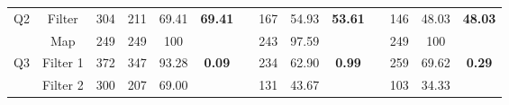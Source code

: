 \begin{table}
\begin{tabular}{cccccccccccccc}
\multirow{2}{*}{Q2}             & Filter                              & 304                             & 211                                                                     & 69.41                                                                      & \multirow{2}{*}{\textbf{69.41}} &           & 167                                                                     & 54.93                                                                      & \multirow{2}{*}{\textbf{53.61}} &           & 146                                                                     & 48.03                                                                      & \multirow{2}{*}{\textbf{48.03}} \\
                                & Map                                 & 249                             & 249                                                                     & 100                                                                        &                                 &           & 243                                                                     & 97.59                                                                      &                                 &           & 249                                                                     & 100                                                                        &                                 \\ \hline
\multirow{4}{*}{Q3}             & Filter 1                            & 372                             & 347                                                                     & 93.28                                                                      & \multirow{4}{*}{\textbf{0.09}}  &           & 234                                                                     & 62.90                                                                      & \multirow{4}{*}{\textbf{0.99}}  &           & 259                                                                     & 69.62                                                                      & \multirow{4}{*}{\textbf{0.29}}  \\
                                & Filter 2                            & 300                             & 207                                                                     & 69.00                                                                      &                                 &           & 131                                                                     & 43.67                                                                      &                                 &           & 103                                                                     & 34.33                                                                      &                                 \\

\end{tabular}
\end{table}
